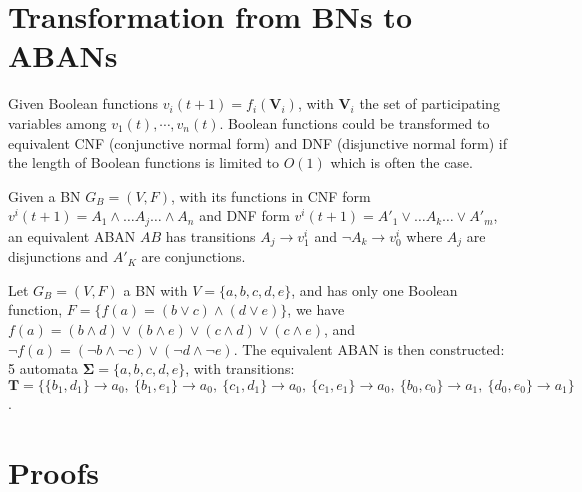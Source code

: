 \documentclass{entcs}
\newcommand{\acm}[3]{\{#1\}\rightarrow#2}
\begin{document}



\appendix

\section{Transformation from BNs to ABANs}\label{trans}

Given Boolean functions $v_i(t+1)=f_i(\mathbf{V}_i)$, with $\mathbf{V}_i$ the set of participating variables among $v_1(t),\cdots,v_n(t)$.
Boolean functions could be transformed to equivalent CNF (conjunctive normal form) and DNF (disjunctive normal form) if the length of Boolean functions is limited to $O(1)$ \cite{miltersen2005converting} which is often the case.
\begin{proposition}
Given a BN $G_B=(V,F)$, with its functions in CNF form $v^i(t+1)=A_1\land\ldots A_j \ldots\land A_n$ and DNF form $v^i(t+1)=A'_1\lor\ldots A_k\ldots\lor A'_m$, an equivalent ABAN $AB$ has transitions $A_j\to v^i_1$ and $\lnot A_k\to v^i_0$ where $A_j$ are disjunctions and $A'_K$ are conjunctions.
\end{proposition}
\begin{example}
Let $G_B=(V,F)$ a BN with $V=\{a,b,c,d,e\}$, and has only one Boolean function, $F=\{f(a)= (b\lor c)\land(d\lor e)\}$, we have 
$f(a)=(b\land d)\lor(b\land e)\lor(c\land d)\lor(c\land e)$, and $\lnot f(a)=(\lnot b\land \lnot c)\lor(\lnot d\land \lnot e)$. 
The equivalent ABAN is then constructed: 5 automata $\mathbf{\Sigma}=\{a,b,c,d,e\}$, with transitions: $\mathbf{T}=\{\acm{b_1,d_1}{a_0}{a_1},\ \acm{b_1,e_1}{a_0}{a_1},\ \acm{c_1,d_1}{a_0}{a_1},\ \acm{c_1,e_1}{a_0}{a_1},\ \acm{b_0,c_0}{a_1}{a_0},\ \acm{d_0,e_0}{a_1}{a_0}\}$.
\end{example}

\section{Proofs}\label{sec:proof} %
\end{document}
